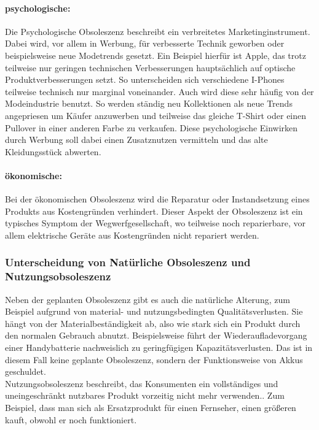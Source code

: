 \documentclass[13pt,titlepage]{article}
\begin{document}
	\paragraph {psychologische:}
	Die Psychologische Obsoleszenz beschreibt ein verbreitetes Marketinginstrument. 
Dabei wird, vor allem in Werbung, für verbesserte Technik geworben oder beispielsweise neue Modetrends gesetzt. 
Ein Beispiel hierfür ist Apple, das trotz teilweise nur geringen technischen Verbesserungen hauptsächlich auf optische Produktverbesserungen setzt. 
So unterscheiden sich verschiedene I-Phones teilweise technisch nur marginal voneinander. Auch wird diese sehr häufig von der Modeindustrie benutzt. 
So werden ständig neu Kollektionen als neue Trends angepriesen um Käufer anzuwerben und teilweise das gleiche T-Shirt oder einen Pullover in einer anderen Farbe zu verkaufen. 
Diese psychologische Einwirken durch Werbung soll dabei einen Zusatznutzen vermitteln und das alte Kleidungsst\"uck abwerten.
	\paragraph {\"okonomische:}
	Bei der \"okonomischen Obsoleszenz wird die Reparatur oder Instandsetzung eines Produkts aus Kostengr\"unden verhindert. 
Dieser Aspekt der Obsoleszenz ist ein typisches Symptom der Wegwerfgesellschaft, wo teilweise noch reparierbare, vor allem elektrische Ger\"ate aus Kostengr\"unden nicht repariert werden.\\
	
	\subsubsection {Unterscheidung von Nat\"urliche Obsoleszenz und Nutzungsobsoleszenz}
	Neben der geplanten Obsoleszenz gibt es auch die nat\"urliche Alterung, zum Beispiel aufgrund von material- und nutzungsbedingten Qualitätsverlusten. 
Sie h\"angt von der Materialbest\"andigkeit ab, also wie stark sich ein Produkt durch den normalen Gebrauch abnutzt. 
Beispielsweise f\"uhrt der Wiederaufladevorgang einer Handybatterie nachweislich zu geringf\"ugigen Kapazit\"atsverlusten\protect\footnotemark{}. 
Das ist in diesem Fall keine geplante Obsoleszenz, sondern der Funktionsweise von Akkus geschuldet.\\
Nutzungsobsoleszenz beschreibt, das Konsumenten ein vollständiges und uneingeschr\"ankt nutzbares Produkt vorzeitig nicht mehr verwenden.\protect\footnotemark{}. 
Zum Beispiel, dass man sich als Ersatzprodukt f\"ur einen Fernseher, einen gr\"oßeren kauft, obwohl er noch funktioniert.
\end{document}
